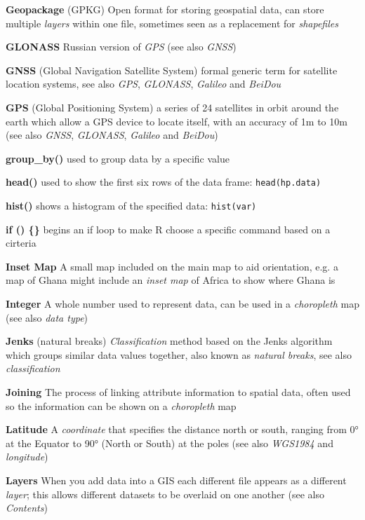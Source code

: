 \documentclass[a4paper,10pt]{article}
\begin{document}
\begin{multicols}{2}
\textbf{Geopackage} (GPKG) Open format for storing geospatial data, can store multiple \textit{layers} within one file, sometimes seen as a replacement for \textit{shapefiles}

\textbf{GLONASS} Russian version of \textit{GPS} (see also \textit{GNSS})

\textbf{GNSS} (Global Navigation Satellite System) formal generic term for satellite location systems, see also \textit{GPS}, \textit{GLONASS}, \textit{Galileo} and \textit{BeiDou}

\textbf{GPS} (Global Positioning System) a series of 24 satellites in orbit around the earth which allow a GPS device to locate itself, with an accuracy of 1m to 10m  (see also \textit{GNSS}, \textit{GLONASS}, \textit{Galileo} and \textit{BeiDou})

\textbf{group\_by()} used to group data by a specific value

\textbf{head()} used to show the first six rows of the data frame: \texttt{head(hp.data)}

\textbf{hist()} shows a histogram of the specified data: \texttt{hist(var)}

\textbf{if () \{\} } begins an if loop to make R choose a specific command based on a cirteria

\textbf{Inset Map} A small map included on the main map to aid orientation, e.g. a map of Ghana might include an \textit{inset map} of Africa to show where Ghana is

\textbf{Integer} A whole number used to represent data, can be used in a \textit{choropleth} map (see also \textit{data type}) 

\textbf{Jenks} (natural breaks) \textit{Classification} method based on the Jenks algorithm which groups similar data values together, also known as \textit{natural breaks}, see also \textit{classification}

\textbf{Joining} The process of linking attribute information to spatial data, often used so the information can be shown on a \textit{choropleth} map 

\textbf{Latitude} A \textit{coordinate} that specifies the distance north or south, ranging from \ang{0} at the Equator to \ang{90} (North or South) at the poles (see also \textit{WGS1984} and \textit {longitude})

\textbf{Layers} When you add data into a GIS each different file appears as a different \textit{layer}; this allows different datasets to be overlaid on one another (see also \textit{Contents})


\end{multicols}
\end{document}
